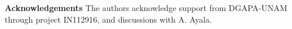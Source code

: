 \documentclass[12pt]{article}
\renewcommand\[{\begin{dmath}}
\renewcommand\]{\end{dmath}}
\begin{document}


















{\bf Acknowledgements}
 The
authors acknowledge  support from  DGAPA-UNAM through project IN112916, and discussions with A. Ayala.
\end{document}
